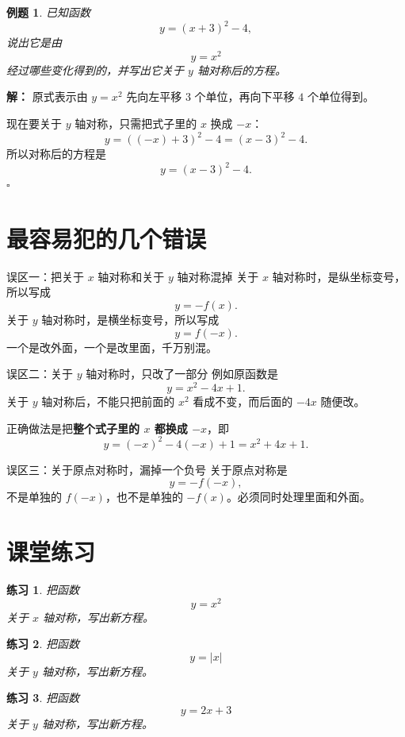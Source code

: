 \documentclass[11pt,a4paper,fontset=fandol]{ctexart}
\theoremstyle{formaltheorem}
\theoremstyle{formalexample}
\newtheorem{example}{例题}[section]
\newtheorem{exercise}{练习}[section]
\newenvironment{solution}{\par\noindent\textbf{解：}}{\hfill$\square$\par}
\begin{document}
\begin{example}
已知函数
\[
y=(x+3)^2-4,
\]
说出它是由
\[
y=x^2
\]
经过哪些变化得到的，并写出它关于 $y$ 轴对称后的方程。
\end{example}

\begin{solution}
原式表示由 $y=x^2$ 先向左平移 $3$ 个单位，再向下平移 $4$ 个单位得到。

现在要关于 $y$ 轴对称，只需把式子里的 $x$ 换成 $-x$：
\[
y=((-x)+3)^2-4=(x-3)^2-4.
\]
所以对称后的方程是
\[
\boxed{y=(x-3)^2-4}.
\]
\end{solution}

\section{最容易犯的几个错误}

\begin{notebox}{误区一：把关于 $x$ 轴对称和关于 $y$ 轴对称混掉}
关于 $x$ 轴对称时，是纵坐标变号，所以写成
\[
y=-f(x).
\]
关于 $y$ 轴对称时，是横坐标变号，所以写成
\[
y=f(-x).
\]
一个是改外面，一个是改里面，千万别混。
\end{notebox}

\begin{notebox}{误区二：关于 $y$ 轴对称时，只改了一部分}
例如原函数是
\[
y=x^2-4x+1.
\]
关于 $y$ 轴对称后，不能只把前面的 $x^2$ 看成不变，而后面的 $-4x$ 随便改。

正确做法是把\textbf{整个式子里的 $x$ 都换成 $-x$}，即
\[
y=(-x)^2-4(-x)+1=x^2+4x+1.
\]
\end{notebox}

\begin{notebox}{误区三：关于原点对称时，漏掉一个负号}
关于原点对称是
\[
y=-f(-x),
\]
不是单独的 $f(-x)$，也不是单独的 $-f(x)$。必须同时处理里面和外面。
\end{notebox}

\section{课堂练习}

\begin{exercise}
把函数
\[
y=x^2
\]
关于 $x$ 轴对称，写出新方程。
\end{exercise}

\begin{exercise}
把函数
\[
y=|x|
\]
关于 $y$ 轴对称，写出新方程。
\end{exercise}

\begin{exercise}
把函数
\[
y=2x+3
\]
关于 $y$ 轴对称，写出新方程。
\end{exercise}
\end{document}
